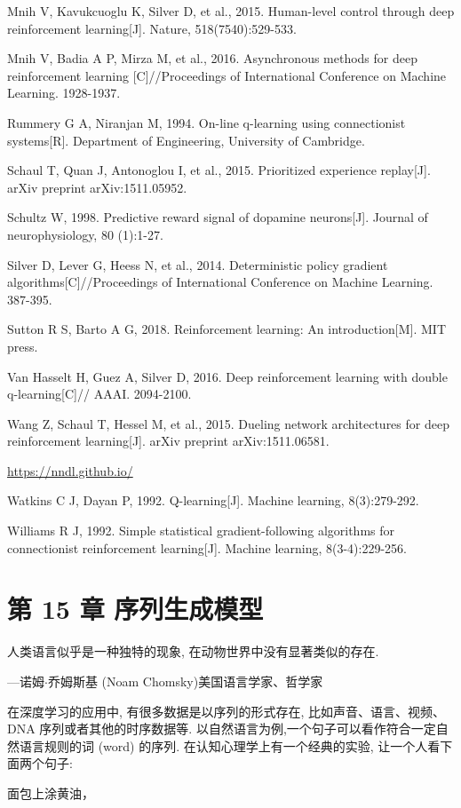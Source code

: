 \documentclass[10pt]{article}
\begin{document}
Mnih V, Kavukcuoglu K, Silver D, et al., 2015. Human-level control through deep reinforcement learning[J]. Nature, 518(7540):529-533.

Mnih V, Badia A P, Mirza M, et al., 2016. Asynchronous methods for deep reinforcement learning [C]//Proceedings of International Conference on Machine Learning. 1928-1937.

Rummery G A, Niranjan M, 1994. On-line q-learning using connectionist systems[R]. Department of Engineering, University of Cambridge.

Schaul T, Quan J, Antonoglou I, et al., 2015. Prioritized experience replay[J]. arXiv preprint arXiv:1511.05952.

Schultz W, 1998. Predictive reward signal of dopamine neurons[J]. Journal of neurophysiology, 80 (1):1-27.

Silver D, Lever G, Heess N, et al., 2014. Deterministic policy gradient algorithms[C]//Proceedings of International Conference on Machine Learning. 387-395.

Sutton R S, Barto A G, 2018. Reinforcement learning: An introduction[M]. MIT press.

Van Hasselt H, Guez A, Silver D, 2016. Deep reinforcement learning with double q-learning[C]// AAAI. 2094-2100.

Wang Z, Schaul T, Hessel M, et al., 2015. Dueling network architectures for deep reinforcement learning[J]. arXiv preprint arXiv:1511.06581.

\href{https://nndl.github.io/}{https://nndl.github.io/}

Watkins C J, Dayan P, 1992. Q-learning[J]. Machine learning, 8(3):279-292.

Williams R J, 1992. Simple statistical gradient-following algorithms for connectionist reinforcement learning[J]. Machine learning, 8(3-4):229-256.

\section*{第 15 章 序列生成模型}
人类语言似乎是一种独特的现象, 在动物世界中没有显著类似的存在.

—诺姆$\cdot$乔姆斯基 (Noam Chomsky)美国语言学家、哲学家

在深度学习的应用中, 有很多数据是以序列的形式存在, 比如声音、语言、视频、DNA 序列或者其他的时序数据等. 以自然语言为例,一个句子可以看作符合一定自然语言规则的词 (word) 的序列. 在认知心理学上有一个经典的实验, 让一个人看下面两个句子:

面包上涂黄油，
\end{document}
